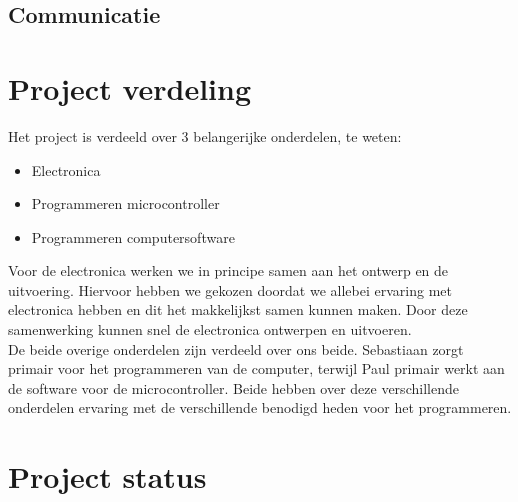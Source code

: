 \documentclass[a4paper,titlepage]{artikel1}
\begin{document}
\subsection{Communicatie}
\section{Project verdeling}
Het project is verdeeld over 3 belangerijke onderdelen, te weten:
\begin{itemize}
  \item Electronica
  \item Programmeren microcontroller
  \item Programmeren computersoftware
\end{itemize}
Voor de electronica werken we in principe samen aan het ontwerp en de uitvoering. Hiervoor hebben we gekozen doordat we allebei ervaring met electronica hebben en dit het makkelijkst samen kunnen maken. Door deze samenwerking kunnen snel de electronica ontwerpen en uitvoeren.\\De beide overige onderdelen zijn verdeeld over ons beide. Sebastiaan zorgt primair voor het programmeren van de computer, terwijl Paul primair werkt aan de software voor de microcontroller. Beide hebben over deze verschillende onderdelen ervaring met de verschillende benodigd heden voor het programmeren. 
\section{Project status}

\end{document}
